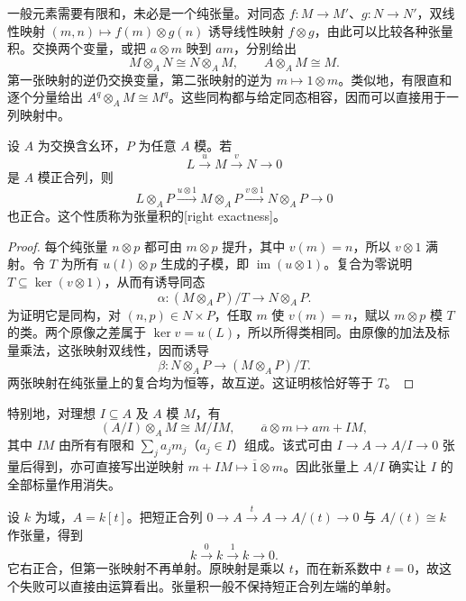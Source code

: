 一般元素需要有限和，未必是一个纯张量。对同态 \(f:M\rightarrow M'\)、\(g:N\rightarrow N'\)，双线性映射 \((m,n)\mapsto f(m)\otimes g(n)\) 诱导线性映射 \(f\otimes g\)，由此可以比较各种张量积。交换两个变量，或把 \(a\otimes m\) 映到 \(am\)，分别给出
\[
	M\otimes_A N\cong N\otimes_A M,\qquad
	A\otimes_A M\cong M.
\]
第一张映射的逆仍交换变量，第二张映射的逆为 \(m\mapsto1\otimes m\)。类似地，有限直和逐个分量给出 \(A^q\otimes_A M\cong M^q\)。这些同构都与给定同态相容，因而可以直接用于一列映射中。

\begin{proposition}\label{g5:prop:tensor-right-exact}
	设 \(A\) 为交换含幺环，\(P\) 为任意 \(A\) 模。若
	\[
		L\xrightarrow{u}M\xrightarrow{v}N\longrightarrow0
	\]
	是 \(A\) 模正合列，则
	\[
		L\otimes_A P\xrightarrow{u\otimes1}M\otimes_A P
		\xrightarrow{v\otimes1}N\otimes_A P\longrightarrow0
	\]
	也正合。这个性质称为张量积的[right exactness]。
\end{proposition}
\begin{proof}
	每个纯张量 \(n\otimes p\) 都可由 \(m\otimes p\) 提升，其中 \(v(m)=n\)，所以 \(v\otimes1\) 满射。令 \(T\) 为所有 \(u(l)\otimes p\) 生成的子模，即 \(\operatorname{im}(u\otimes1)\)。复合为零说明 \(T\subseteq\ker(v\otimes1)\)，从而有诱导同态
	\[
		\alpha:(M\otimes_A P)/T\longrightarrow N\otimes_A P.
	\]
	为证明它是同构，对 \((n,p)\in N\times P\)，任取 \(m\) 使 \(v(m)=n\)，赋以 \(m\otimes p\) 模 \(T\) 的类。两个原像之差属于 \(\ker v=u(L)\)，所以所得类相同。由原像的加法及标量乘法，这张映射双线性，因而诱导
	\[
		\beta:N\otimes_A P\longrightarrow(M\otimes_A P)/T.
	\]
	两张映射在纯张量上的复合均为恒等，故互逆。这证明核恰好等于 \(T\)。
\end{proof}

特别地，对理想 \(I\subseteq A\) 及 \(A\) 模 \(M\)，有
\begin{equation}\label{g5:eq:quotient-tensor}
	(A/I)\otimes_A M\cong M/IM,\qquad
	\overline a\otimes m\longmapsto am+IM,
\end{equation}
其中 \(IM\) 由所有有限和 \(\sum_j a_jm_j\)（\(a_j\in I\)）组成。该式可由 \(I\rightarrow A\rightarrow A/I\rightarrow0\) 张量后得到，亦可直接写出逆映射 \(m+IM\mapsto\overline1\otimes m\)。因此张量上 \(A/I\) 确实让 \(I\) 的全部标量作用消失。

\begin{example}\label{g5:exm:tensor-loses-injection}
	设 \(k\) 为域，\(A=k[t]\)。把短正合列 \(0\rightarrow A\xrightarrow{t}A\rightarrow A/(t)\rightarrow0\) 与 \(A/(t)\cong k\) 作张量，得到
	\[
		k\xrightarrow{\,0\,}k\xrightarrow{\,1\,}k\longrightarrow0.
	\]
	它右正合，但第一张映射不再单射。原映射是乘以 \(t\)，而在新系数中 \(t=0\)，故这个失败可以直接由运算看出。张量积一般不保持短正合列左端的单射。
\end{example}

